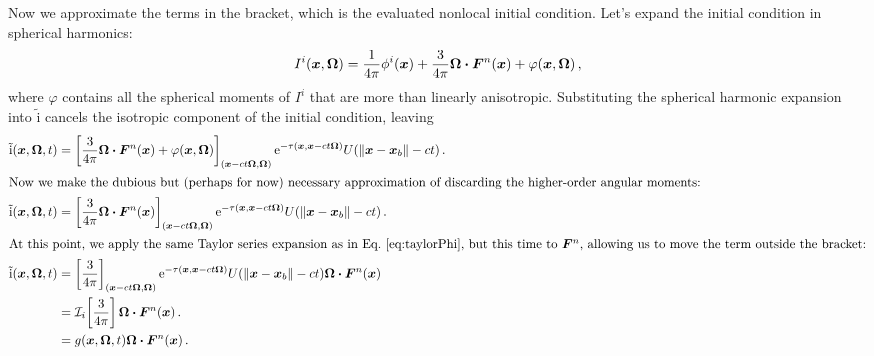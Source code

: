 Now we approximate the terms in the bracket, which is the evaluated nonlocal
initial condition. Let's expand the initial condition in spherical harmonics:
\begin{equation*}
  I^i(\bm{x}, \bm{\Omega}) = \frac{1}{4\pi} \phi^i(\bm{x})
  + \frac{3}{4\pi} \bm{\Omega} \bm{\cdot} \bm{F}^n(\bm{x}) + \varphi(\bm{x}, \bm{\Omega})\,,
\end{equation*}
where $\varphi$ contains all the spherical moments of $I^i$ that are more than
linearly anisotropic. Substituting the spherical harmonic expansion into
$\mathrm{ \tilde i }$ cancels the isotropic component of the initial condition,
leaving
\begin{align} \nonumber
  \mathrm{ \tilde i }(\bm{x}, \bm{\Omega}, t)
  &= \left[ \frac{3}{4\pi} \bm{\Omega} \bm{\cdot} \bm{F}^n(\bm{x})
  + \varphi(\bm{x}, \bm{\Omega}) \right]_{( \bm{x} - ct \bm{\Omega},
  \bm{\Omega})}
    \mathop{}\!\mathrm{e}^{ -\tau(\bm{x}, \bm{x} - ct \bm{\Omega})}
    U( \left\| \bm{x} - \bm{x}_b \right\| - ct)\,.
  \\
  \intertext{Now we make the dubious but (perhaps for now) necessary
  approximation of discarding the higher-order angular moments:} \nonumber
  \mathrm{ \tilde i }(\bm{x}, \bm{\Omega}, t)
  &= \left[ \frac{3}{4\pi} \bm{\Omega} \bm{\cdot} \bm{F}^n(\bm{x}) \right]_{( \bm{x} - ct \bm{\Omega}, \bm{\Omega})}
    \mathop{}\!\mathrm{e}^{ -\tau(\bm{x}, \bm{x} - ct \bm{\Omega})}
    U( \left\| \bm{x} - \bm{x}_b \right\| - ct)\,.
  \\
  \intertext{At this point, we apply the same Taylor series expansion as in
  Eq.~\eqref{eq:taylorPhi}, but this time to $\bm{F}^n$, allowing us to move
  the term outside the bracket:} \nonumber
  \mathrm{ \tilde i }(\bm{x}, \bm{\Omega}, t)
  &= \left[ \frac{3}{4\pi} \right]_{( \bm{x} - ct \bm{\Omega}, \bm{\Omega})}
    \mathop{}\!\mathrm{e}^{ -\tau(\bm{x}, \bm{x} - ct \bm{\Omega})}
    U( \left\| \bm{x} - \bm{x}_b \right\| - ct)  \bm{\Omega} \bm{\cdot} \bm{F}^n(\bm{x})
  \\ \nonumber
  &= \mathcal{I}_{i}\!\left[\frac{3}{4\pi}\right] \bm{\Omega} \bm{\cdot} \bm{F}^n(\bm{x})\,.
  \\\label{eq:tildeI}
  &= g(\bm{x}, \bm{\Omega}, t) \bm{\Omega} \bm{\cdot} \bm{F}^n(\bm{x})\,.
\end{align}

